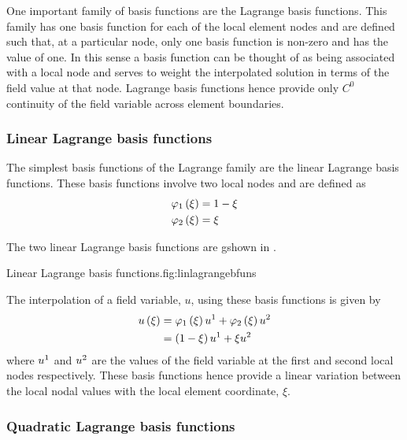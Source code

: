 One important family of basis functions are the Lagrange basis functions. This
family has one basis function for each of the local element nodes and are
defined such that, at a particular node, only one basis function is non-zero
and has the value of one. In this sense a basis function can be thought of as
being associated with a local node and serves to weight the interpolated
solution in terms of the field value at that node. Lagrange basis functions
hence provide only $C^{0}$ continuity of the field variable across element
boundaries.

\subsubsection{Linear Lagrange basis functions}

The simplest basis functions of the Lagrange family are the \onedal linear
Lagrange basis functions. These basis functions involve two local nodes and
are defined as
\begin{equation}
  \begin{split}
       \varphi_{1} \left( \xi \right)  &=1-\xi \\
       \varphi_{2} \left( \xi \right)  &=\xi
  \end{split}
  \label{eqn:linearlbfuns}
\end{equation}

The two \onedal linear Lagrange basis functions are gshown in .

{Linear Lagrange basis functions.}{fig:linlagrangebfuns}

The interpolation of a field variable, $u$, using these basis functions is
given by
\begin{equation}
  \begin{split}
     u\left( \xi \right) &=   \varphi_{1} \left( \xi \right)   {u}^{1} +   \varphi_{2} \left( \xi \right)   {u}^{2}  \\
    &=\left( 1-\xi \right) {u}^{1} +\xi {u}^{2} 
  \end{split}
\end{equation}
where $ {u}^{1} $ and $ {u}^{2} $ are the values of the field variable at
the first and second local nodes respectively. These basis functions hence
provide a linear variation between the local nodal values with the local
element coordinate, $\xi$.

\subsubsection{Quadratic Lagrange basis functions}

